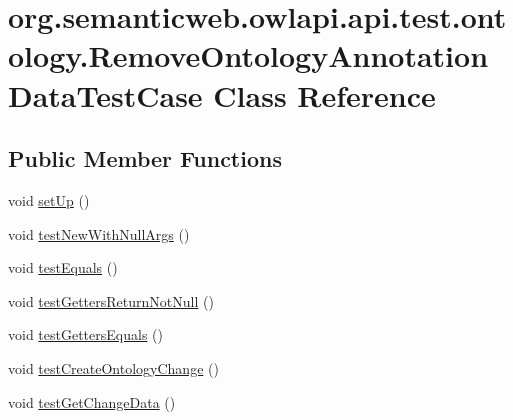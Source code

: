 \hypertarget{classorg_1_1semanticweb_1_1owlapi_1_1api_1_1test_1_1ontology_1_1_remove_ontology_annotation_data_test_case}{\section{org.\-semanticweb.\-owlapi.\-api.\-test.\-ontology.\-Remove\-Ontology\-Annotation\-Data\-Test\-Case Class Reference}
\label{classorg_1_1semanticweb_1_1owlapi_1_1api_1_1test_1_1ontology_1_1_remove_ontology_annotation_data_test_case}
}
\subsection*{Public Member Functions}
\begin{DoxyCompactItemize}
\item 
void \hyperlink{classorg_1_1semanticweb_1_1owlapi_1_1api_1_1test_1_1ontology_1_1_remove_ontology_annotation_data_test_case_a9e765340bed2bb85ac50b2d64d30e657}{set\-Up} ()
\item 
void \hyperlink{classorg_1_1semanticweb_1_1owlapi_1_1api_1_1test_1_1ontology_1_1_remove_ontology_annotation_data_test_case_a0400e172d1a52490b8fc77507c1ed56b}{test\-New\-With\-Null\-Args} ()
\item 
void \hyperlink{classorg_1_1semanticweb_1_1owlapi_1_1api_1_1test_1_1ontology_1_1_remove_ontology_annotation_data_test_case_a5a3bb0da7881752cf6a69f9a0cb914d6}{test\-Equals} ()
\item 
void \hyperlink{classorg_1_1semanticweb_1_1owlapi_1_1api_1_1test_1_1ontology_1_1_remove_ontology_annotation_data_test_case_a934f3dd657196ee1455847ff3bd9617a}{test\-Getters\-Return\-Not\-Null} ()
\item 
void \hyperlink{classorg_1_1semanticweb_1_1owlapi_1_1api_1_1test_1_1ontology_1_1_remove_ontology_annotation_data_test_case_a645fa36ab034e4fb9a42c83c9ff3c8ed}{test\-Getters\-Equals} ()
\item 
void \hyperlink{classorg_1_1semanticweb_1_1owlapi_1_1api_1_1test_1_1ontology_1_1_remove_ontology_annotation_data_test_case_ae0badc27b2ce60176eb3693d72d1a1ca}{test\-Create\-Ontology\-Change} ()
\item 
void \hyperlink{classorg_1_1semanticweb_1_1owlapi_1_1api_1_1test_1_1ontology_1_1_remove_ontology_annotation_data_test_case_adcd121642adebf5a51a31fc3e4c29847}{test\-Get\-Change\-Data} ()
\end{DoxyCompactItemize}
